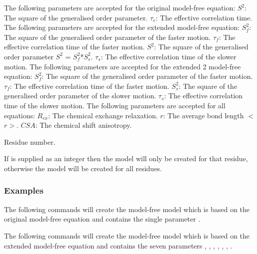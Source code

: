 The following parameters are accepted for the original model-free equation:
    $S^2$:     The square of the generalised order parameter.
    $\tau_e$:     The effective correlation time.
The following parameters are accepted for the extended model-free equation:
    $S^2_f$:    The square of the generalised order parameter of the faster motion.
    $\tau_f$:     The effective correlation time of the faster motion.
    $S^2$:     The square of the generalised order parameter $S^2$ = $S^2_f$*$S^2_s$.
    $\tau_s$:     The effective correlation time of the slower motion.
The following parameters are accepted for the extended 2 model-free equation:
    $S^2_f$:    The square of the generalised order parameter of the faster motion.
    $\tau_f$:     The effective correlation time of the faster motion.
    $S^2_s$:    The square of the generalised order parameter of the slower motion.
    $\tau_s$:     The effective correlation time of the slower motion.
The following parameters are accepted for all equations:
    $R_{ex}$:    The chemical exchange relaxation.
    $r$:      The average bond length $<$$r$$>$.
    $CSA$:    The chemical shift anisotropy.


Residue number.

If 
 is supplied as an integer then the model will only be created for that residue,
otherwise the model will be created for all residues.


\subsubsection{Examples}

The following commands will create the model-free model 
 which is based on the original
model-free equation and contains the single parameter 
.





The following commands will create the model-free model 
 which is based on the
extended model-free equation and contains the seven parameters 
, 
, 
, 
,
, 
, 
.


